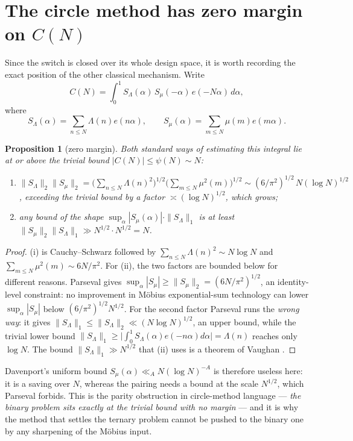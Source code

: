 \documentclass[11pt,a4paper]{article}
\theoremstyle{plain}
\newtheorem{proposition}[theorem]{Proposition}
\theoremstyle{definition}
\theoremstyle{remark}
\begin{document}
\section{The circle method has zero margin on
\texorpdfstring{$C(N)$}{C(N)}}\label{sec:circle}

Since the switch is closed over its whole design space, it is worth
recording the exact position of the other classical mechanism. Write
\[
  C(N)=\int_0^1S_\Lambda(\alpha)\,S_\mu(-\alpha)\,e(-N\alpha)\,d\alpha,
\]
where
\[
  S_\Lambda(\alpha)=\sum_{n\le N}\Lambda(n)e(n\alpha),
  \qquad
  S_\mu(\alpha)=\sum_{m\le N}\mu(m)e(m\alpha).
\]

\begin{proposition}[zero margin]\label{prop:E}
Both standard ways of estimating this integral lie at or above the
trivial bound $|C(N)|\le\psi(N)\sim N$:
\begin{enumerate}
\item[(i)] $\|S_\Lambda\|_2\|S_\mu\|_2
   =\bigl(\sum_{n\le N}\Lambda(n)^2\bigr)^{1/2}
     \bigl(\sum_{m\le N}\mu^2(m)\bigr)^{1/2}
   \sim(6/\pi^2)^{1/2}\,N(\log N)^{1/2}$, exceeding the trivial bound
   by a factor $\asymp(\log N)^{1/2}$, which \emph{grows};
\item[(ii)] any bound of the shape
  $\sup_\alpha|S_\mu(\alpha)|\cdot\|S_\Lambda\|_1$ is at least
  $\|S_\mu\|_2\|S_\Lambda\|_1\gg N^{1/2}\cdot N^{1/2}=N$.
\end{enumerate}
\end{proposition}

\begin{proof}
(i) is Cauchy--Schwarz followed by
$\sum_{n\le N}\Lambda(n)^2\sim N\log N$ and
$\sum_{m\le N}\mu^2(m)\sim6N/\pi^2$. For (ii), the two factors are
bounded below for different reasons. Parseval gives
$\sup_\alpha|S_\mu|\ge\|S_\mu\|_2=(6N/\pi^2)^{1/2}$, an
identity-level constraint: no improvement in M\"obius
exponential-sum technology can lower $\sup_\alpha|S_\mu|$ below
$(6/\pi^2)^{1/2}N^{1/2}$. For the second factor Parseval runs the
\emph{wrong way}: it gives $\|S_\Lambda\|_1\le\|S_\Lambda\|_2
\ll(N\log N)^{1/2}$, an upper bound, while the trivial lower bound
$\|S_\Lambda\|_1\ge\bigl|\int_0^1S_\Lambda(\alpha)e(-n\alpha)
d\alpha\bigr|=\Lambda(n)$ reaches only $\log N$. The bound
$\|S_\Lambda\|_1\gg N^{1/2}$ that (ii) uses is a theorem of Vaughan
\cite{Vau88}.
\end{proof}

Davenport's uniform bound $S_\mu(\alpha)\ll_AN(\log N)^{-A}$ is
therefore useless here: it is a saving over $N$, whereas the pairing
needs a bound at the scale $N^{1/2}$, which Parseval forbids. This is
the parity obstruction in circle-method language --- \emph{the binary
problem sits exactly at the trivial bound with no margin} --- and it
is why the method that settles the ternary problem cannot be pushed to
the binary one by any sharpening of the M\"obius input.
\end{document}
